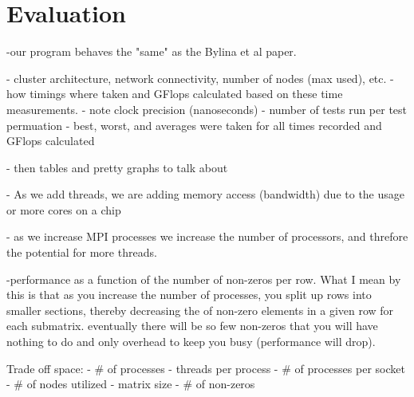 \section{Evaluation}\label{sec:dspmv-evaluation}
-our program behaves the "same" as the Bylina et al paper. 

- cluster architecture, network connectivity, number of nodes (max used), etc.
- how timings where taken and GFlops calculated based on these time measurements. 
	- note clock precision (nanoseconds)
- number of tests run per test permuation
	- best, worst, and averages were taken for all times recorded and GFlops calculated
	
- then tables and pretty graphs to talk about 


- As we add threads, we are adding memory access (bandwidth) due to the usage or more cores on a chip

- as we increase MPI processes we increase the number of processors, and threfore the potential for more threads.

-performance as a function of the number of non-zeros per row. What I mean by this is that as you increase the number of processes, you split up rows into smaller sections, thereby decreasing the of non-zero elements in a given row for each submatrix. 
	\-eventually there will be so few non-zeros that you will have nothing to do and only overhead to keep you busy (performance will drop).
	
Trade off space:
	- \# of processes
	- threads per process
	- \# of processes per socket
	- \# of nodes utilized
	- matrix size
	- \# of non-zeros